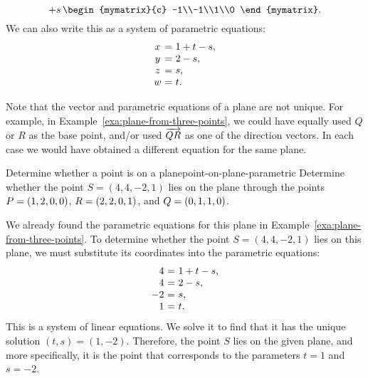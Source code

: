 \begin{solution}
\begin{equation*}
    + s\,\begin{mymatrix}{c} -1\\-1\\1\\0 \end{mymatrix}.
  \end{equation*}
  We can also write this as a system of parametric equations:
  \begin{equation*}
    \begin{array}{c@{~}c@{~}l}
      x &=& 1 + t - s, \\
      y &=& 2 - s, \\
      z &=& s, \\
      w &=& t.
    \end{array}
  \end{equation*}
\end{solution}

Note that the vector and parametric equations of a plane are not
unique. For example, in Example~\ref{exa:plane-from-three-points}, we
could have equally used $Q$ or $R$ as the base point, and/or used
$\overrightarrow{QR}$ as one of the direction vectors. In each case we would
have obtained a different equation for the same plane.

\begin{example}{Determine whether a point is on a plane}{point-on-plane-parametric}
  Determine whether the point $S=(4,4,-2,1)$ lies on the plane through
  the points $P = \left(1,2,0,0\right)$, $R = \left(2,2,0,1\right)$, and
  $Q = \left(0,1,1,0\right)$.
\end{example}

\begin{solution}
  We already found the parametric equations for this plane in
  Example~\ref{exa:plane-from-three-points}. To determine whether the
  point $S=(4,4,-2,1)$ lies on this plane, we must substitute its
  coordinates into the parametric equations:
  \begin{equation*}
    \begin{array}{r@{~}c@{~}l}
      4 &=& 1 + t - s, \\
      4 &=& 2 - s, \\
      -2 &=& s, \\
      1 &=& t.
    \end{array}
  \end{equation*}
  This is a system of linear equations. We solve it to find that it
  has the unique solution $(t,s) = (1,-2)$. Therefore, the point $S$
  lies on the given plane, and more specifically, it is the point that
  corresponds to the parameters $t=1$ and $s=-2$.
\end{solution}


